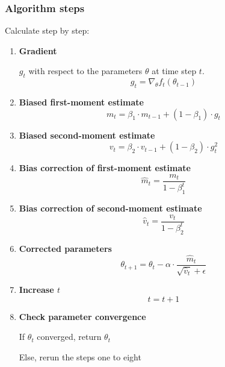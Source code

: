\documentclass[oneside]{article}
\begin{document}
\subsubsection{Algorithm steps} \label{Alg_steps}
Calculate step by step:
\begin{enumerate}
    \item \textbf{Gradient} \par
    \(g_t\) with respect to the parameters \(\theta\) at time step \(t\).
    \begin{equation}
        g_t= \nabla_{\theta} f_t(\theta_{t-1})
    \end{equation}
    \item \textbf{Biased first-moment estimate}
    \begin{equation}
        m_t = \beta_1 \cdot m_{t-1} + (1 - \beta_1) \cdot g_t
    \end{equation}
    
    \item \textbf{Biased second-moment estimate}
    \begin{equation}
        v_t = \beta_2 \cdot v_{t-1} + (1 - \beta_2) \cdot g_t^2
    \end{equation}
    
    \item \textbf{Bias correction of first-moment estimate}
    \begin{equation}
        \hat{m}_t = \frac{m_t}{1 - \beta_1^t}
    \end{equation}
    
    \item \textbf{Bias correction of second-moment estimate}
    \begin{equation}
        \hat{v}_t = \frac{v_t}{1 - \beta_2^t}
    \end{equation}
    
    \item  \textbf{Corrected parameters}
    \begin{equation}
        \theta_{t+1} = \theta_t - \alpha \cdot \frac{\hat{m}_t}{\sqrt{\hat{v}_t} + \epsilon}
    \end{equation}
    
    \item \textbf{Increase $t$} 
    \begin{equation}
        t = t + 1
    \end{equation}
    \item \textbf{Check parameter convergence}\par
    If $\theta_t$ converged, return $\theta_t$\par
    Else, rerun the steps one to eight
\end{enumerate}
\end{document}

